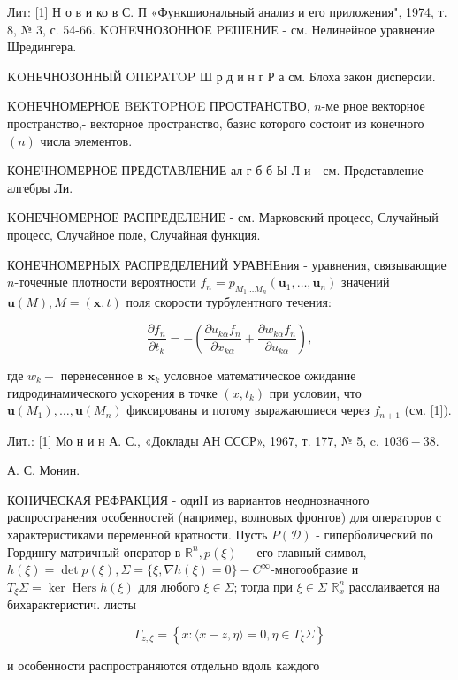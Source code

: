 \documentclass[10pt]{article}
\begin{document}
Лит: [1] Н о в и ко в С. П «Функшиональный анализ и его приложения", 1974, т. 8, № 3, с. 54-66. KOHEЧНОЗОННОЕ PEШЕНИЕ - см. Нелинейное уравнение Шредингера.



KOHЕЧНОЗОННЫЙ OПEPATOP Ш р д и н г Р а см. Блоха закон дисперсии.



KOHЕЧНОМЕРНОЕ BEKTOPHOE ПРОСТРАНСТВО, $n$-ме рное векторное пространство,- векторное пространство, базис которого состоит из конечного $(n)$ числа элементов.



КОНЕЧНОМЕРНОЕ ПРЕДСТАВЛЕНИЕ ал г б б Ы Л и - см. Представление алгебры Ли.



KОНЕЧНОМЕРНОЕ РАСПРЕДЕЛЕНИЕ - см. Марковский процесс, Случайный процесс, Случайное поле, Случайная функция.



КОНЕЧНОМЕРНЫХ РАСПРЕДЕЛЕНИЙ УРАВНЕния - уравнения, связывающие $n$-точечные плотности вероятности $f_{n}=p_{M_{1} \ldots M_{n}}\left(\boldsymbol{u}_{1}, \ldots, \boldsymbol{u}_{n}\right)$ значений $\boldsymbol{u}(M), M=(\boldsymbol{x}, t)$ поля скорости турбулентного течения:



\[

\frac{\partial f_{n}}{\partial t_{k}}=-\left(\frac{\partial u_{k \alpha} f_{n}}{\partial x_{k \alpha}}+\frac{\partial w_{k \alpha} f_{n}}{\partial u_{k \alpha}}\right),

\]



где $w_{k}-$ перенесенное в $\boldsymbol{x}_{k}$ условное математическое ожидание гидродинамического ускорения в точке $\left(x, t_{k}\right)$ при условии, что $\boldsymbol{u}\left(M_{1}\right), \ldots, \boldsymbol{u}\left(M_{n}\right)$ фиксированы и потому выражаюшиеся через $f_{n+1}$ (см. [1]).



Лит.: [1] Мо н и н А. С., «Доклады АН СССР», 1967, т. 177, № 5, c. $1036-38$.



А. С. Монин.



КОНИЧЕСКАЯ РЕФРАКЦИЯ - одиН из вариантов неоднозначного распространения особенностей (например, волновых фронтов) для операторов с характеристиками переменной кратности. Пусть $P(\mathscr{D})$ - гиперболический по Гордингу матричный оператор в $\mathbb{R}^{n}, p(\xi)-$ его главный символ, $h(\xi)=\operatorname{det} p(\xi), \Sigma=\{\xi, \nabla h(\xi)=0\}-C^{\infty}$-многообразие и $T_{\xi} \Sigma=\operatorname{ker} \operatorname{Hers} h(\xi)$ для любого $\xi \in \Sigma$; тогда при $\xi \in \Sigma$ $\mathbb{R}_{x}^{n}$ расслаивается на бихарактеристич. листы



\[

\Gamma_{z, \xi}=\left\{x:\langle x-z, \eta\rangle=0, \eta \in T_{\xi} \Sigma\right\}

\]



и особенности распространяются отдельно вдоль каждого
\end{document}
